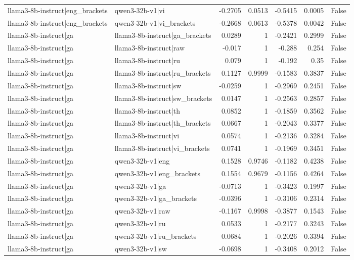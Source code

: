 \begin{table}
\begin{tabular}{l l r r r r l}
llama3-8b-instruct|eng_brackets & qwen3-32b-v1|vi & -0.2705 & 0.0513 & -0.5415 & 0.0005 & False \\
llama3-8b-instruct|eng_brackets & qwen3-32b-v1|vi_brackets & -0.2668 & 0.0613 & -0.5378 & 0.0042 & False \\
llama3-8b-instruct|ga & llama3-8b-instruct|ga_brackets & 0.0289 & 1 & -0.2421 & 0.2999 & False \\
llama3-8b-instruct|ga & llama3-8b-instruct|raw & -0.017 & 1 & -0.288 & 0.254 & False \\
llama3-8b-instruct|ga & llama3-8b-instruct|ru & 0.079 & 1 & -0.192 & 0.35 & False \\
llama3-8b-instruct|ga & llama3-8b-instruct|ru_brackets & 0.1127 & 0.9999 & -0.1583 & 0.3837 & False \\
llama3-8b-instruct|ga & llama3-8b-instruct|sw & -0.0259 & 1 & -0.2969 & 0.2451 & False \\
llama3-8b-instruct|ga & llama3-8b-instruct|sw_brackets & 0.0147 & 1 & -0.2563 & 0.2857 & False \\
llama3-8b-instruct|ga & llama3-8b-instruct|th & 0.0852 & 1 & -0.1859 & 0.3562 & False \\
llama3-8b-instruct|ga & llama3-8b-instruct|th_brackets & 0.0667 & 1 & -0.2043 & 0.3377 & False \\
llama3-8b-instruct|ga & llama3-8b-instruct|vi & 0.0574 & 1 & -0.2136 & 0.3284 & False \\
llama3-8b-instruct|ga & llama3-8b-instruct|vi_brackets & 0.0741 & 1 & -0.1969 & 0.3451 & False \\
llama3-8b-instruct|ga & qwen3-32b-v1|eng & 0.1528 & 0.9746 & -0.1182 & 0.4238 & False \\
llama3-8b-instruct|ga & qwen3-32b-v1|eng_brackets & 0.1554 & 0.9679 & -0.1156 & 0.4264 & False \\
llama3-8b-instruct|ga & qwen3-32b-v1|ga & -0.0713 & 1 & -0.3423 & 0.1997 & False \\
llama3-8b-instruct|ga & qwen3-32b-v1|ga_brackets & -0.0396 & 1 & -0.3106 & 0.2314 & False \\
llama3-8b-instruct|ga & qwen3-32b-v1|raw & -0.1167 & 0.9998 & -0.3877 & 0.1543 & False \\
llama3-8b-instruct|ga & qwen3-32b-v1|ru & 0.0533 & 1 & -0.2177 & 0.3243 & False \\
llama3-8b-instruct|ga & qwen3-32b-v1|ru_brackets & 0.0684 & 1 & -0.2026 & 0.3394 & False \\
llama3-8b-instruct|ga & qwen3-32b-v1|sw & -0.0698 & 1 & -0.3408 & 0.2012 & False \\

\end{tabular}
\end{table}
